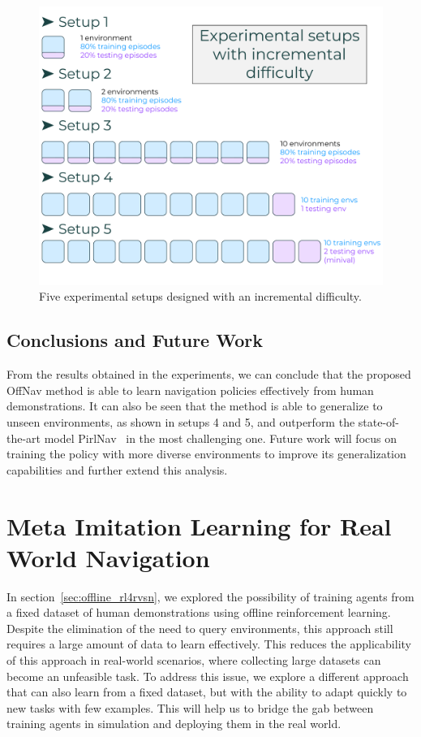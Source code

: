 \begin{figure}
    \centering
    \includegraphics[width=\linewidth]{figures/offnav/experimental_setups}
    \caption{Five experimental setups designed with an incremental difficulty.}
    \label{fig:setups}
\end{figure}

\subsection{Conclusions and Future Work}\label{subsec:conclusions_offnav}

From the results obtained in the experiments, we can conclude that the proposed OffNav method is able to learn navigation policies effectively from human demonstrations.
It can also be seen that the method is able to generalize to unseen environments, as shown in setups 4 and 5, and outperform the state-of-the-art model PirlNav~\cite{ramrakhya2023} in the most challenging one.
Future work will focus on training the policy with more diverse environments to improve its generalization capabilities and further extend this analysis.


\section{Meta Imitation Learning for Real World Navigation}\label{sec:mil-for-real-world-navigation}

In section~\ref{sec:offline_rl4rvsn}, we explored the possibility of training agents from a fixed dataset of human demonstrations using offline reinforcement learning.
Despite the elimination of the need to query environments, this approach still requires a large amount of data to learn effectively.
This reduces the applicability of this approach in real-world scenarios, where collecting large datasets can become an unfeasible task.
To address this issue, we explore a different approach that can also learn from a fixed dataset, but with the ability to adapt quickly to new tasks with few examples.
This will help us to bridge the gab between training agents in simulation and deploying them in the real world.

